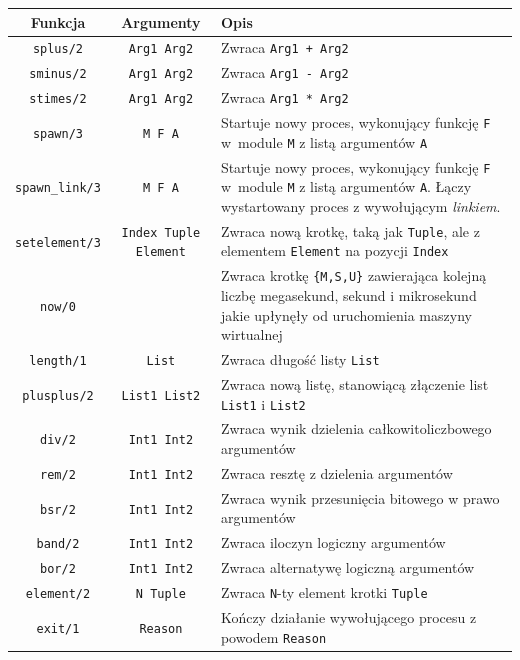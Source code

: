 \begin{longtable}{|c|c|p{7.5cm}|}
\hline

Funkcja & Argumenty & Opis \\
\endfirsthead
\hline
\texttt{splus/2} & \texttt{Arg1 Arg2} & Zwraca \texttt{Arg1 + Arg2} \\
\hline
\texttt{sminus/2} & \texttt{Arg1 Arg2} & Zwraca \texttt{Arg1 - Arg2} \\
\hline
\texttt{stimes/2} & \texttt{Arg1 Arg2} & Zwraca \texttt{Arg1 * Arg2} \\
\hline
\texttt{spawn/3} & \texttt{M F A} & Startuje nowy proces, wykonujący funkcję \texttt{F} w~module \texttt{M} z listą argumentów \texttt{A} \\
\hline
\texttt{spawn\_link/3} & \texttt{M F A} & Startuje nowy proces, wykonujący funkcję \texttt{F} w~module \texttt{M} z listą argumentów \texttt{A}. Łączy wystartowany proces z wywołującym \emph{linkiem}.\\
\hline
\texttt{setelement/3} & \texttt{Index Tuple Element} & Zwraca nową krotkę, taką jak \texttt{Tuple}, ale z elementem \texttt{Element} na pozycji \texttt{Index} \\
\hline
\texttt{now/0} & & Zwraca krotkę \texttt{\{M,S,U\}} zawierająca kolejną liczbę megasekund, sekund i mikrosekund jakie upłynęły od uruchomienia maszyny wirtualnej \\
\hline
\texttt{length/1} & \texttt{List} & Zwraca długość listy \texttt{List} \\
\hline
\texttt{plusplus/2} & \texttt{List1 List2} & Zwraca nową listę, stanowiącą złączenie list \texttt{List1} i \texttt{List2} \\
\hline
\texttt{div/2} & \texttt{Int1 Int2} & Zwraca wynik dzielenia całkowitoliczbowego argumentów \\
\hline
\texttt{rem/2} & \texttt{Int1 Int2} & Zwraca resztę z dzielenia argumentów \\
\hline
\texttt{bsr/2} & \texttt{Int1 Int2} & Zwraca wynik przesunięcia bitowego w prawo argumentów \\
\hline
\texttt{band/2} & \texttt{Int1 Int2} & Zwraca iloczyn logiczny argumentów \\
\hline
\texttt{bor/2} & \texttt{Int1 Int2} & Zwraca alternatywę logiczną argumentów \\
\hline
\texttt{element/2} & \texttt{N Tuple} & Zwraca \texttt{N}-ty element krotki \texttt{Tuple} \\
\hline
\texttt{exit/1} & \texttt{Reason} & Kończy działanie wywołującego procesu z powodem \texttt{Reason} \\

\end{longtable}
